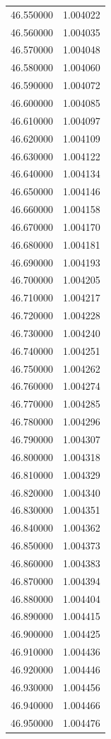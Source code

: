 \begin{tabular}{rr}
46.550000 & 1.004022 \\
46.560000 & 1.004035 \\
46.570000 & 1.004048 \\
46.580000 & 1.004060 \\
46.590000 & 1.004072 \\
46.600000 & 1.004085 \\
46.610000 & 1.004097 \\
46.620000 & 1.004109 \\
46.630000 & 1.004122 \\
46.640000 & 1.004134 \\
46.650000 & 1.004146 \\
46.660000 & 1.004158 \\
46.670000 & 1.004170 \\
46.680000 & 1.004181 \\
46.690000 & 1.004193 \\
46.700000 & 1.004205 \\
46.710000 & 1.004217 \\
46.720000 & 1.004228 \\
46.730000 & 1.004240 \\
46.740000 & 1.004251 \\
46.750000 & 1.004262 \\
46.760000 & 1.004274 \\
46.770000 & 1.004285 \\
46.780000 & 1.004296 \\
46.790000 & 1.004307 \\
46.800000 & 1.004318 \\
46.810000 & 1.004329 \\
46.820000 & 1.004340 \\
46.830000 & 1.004351 \\
46.840000 & 1.004362 \\
46.850000 & 1.004373 \\
46.860000 & 1.004383 \\
46.870000 & 1.004394 \\
46.880000 & 1.004404 \\
46.890000 & 1.004415 \\
46.900000 & 1.004425 \\
46.910000 & 1.004436 \\
46.920000 & 1.004446 \\
46.930000 & 1.004456 \\
46.940000 & 1.004466 \\
46.950000 & 1.004476 \\

\end{tabular}
